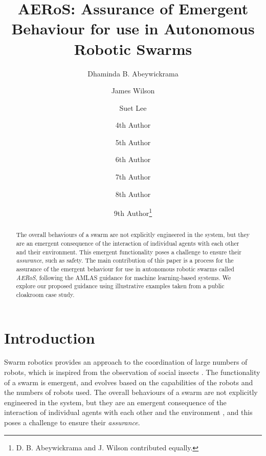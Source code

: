 \documentclass[runningheads]{llncs}
\begin{document}
	\title{AERoS: Assurance of Emergent Behaviour for use in Autonomous Robotic Swarms}%
%
%
\author{Dhaminda B. Abeywickrama\inst{\dag} \and
	James Wilson\inst{\dag} \and
	Suet Lee \and
	4th Author \and
	5th Author \and
	6th Author \and
	7th Author \and
	8th Author \and
	9th Author\thanks{\dag D. B. Abeywickrama and J. Wilson contributed equally.}}
%
%
%
\maketitle              %
%
\begin{abstract} 
The overall behaviours of a swarm are not explicitly engineered in the system, but they are an emergent consequence of the interaction of individual agents with each other and their environment. 
This emergent functionality poses a challenge to ensure their \emph{assurance}, such as safety. 
The main contribution of this paper is a process for the assurance of the emergent behaviour for use in autonomous robotic swarms called \emph{AERoS}, following the AMLAS guidance for machine learning-based systems. 
We explore our proposed guidance using illustrative examples taken from a public cloakroom case study.
	
\end{abstract}


\section{Introduction}\label{introduction}
Swarm robotics provides an approach to the coordination of large numbers of robots, which is inspired from the observation of social insects \cite{Sahin2005}. 
The functionality of a swarm is emergent, and evolves based on the capabilities of the robots and the numbers of robots used. 
The overall behaviours of a swarm are not explicitly engineered in the system, but they are an emergent consequence of the interaction of individual agents with each other and the environment \cite{Abeywickrama2022}, and this poses a challenge to ensure their \emph{assurance}. 
\end{document}
